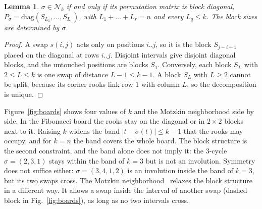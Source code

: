 \documentclass[letterpaper]{article} %
\newtheorem{lemma}{Lemma}
\theoremstyle{definition}
\newcommand{\N}{\mathcal{N}}
\begin{document}
\begin{lemma}\label{lem:blocks}
$\sigma\in\N_k$ if and only if its permutation matrix is block diagonal,
$P_\sigma=\mathrm{diag}(S_{L_1},\dots,S_{L_r})$, with
$L_1+\dots+L_r=n$ and every $L_q\leq k$. The block sizes are determined
by $\sigma$.
\end{lemma}
\begin{proof}
A swap $s(i,j)$ acts only on positions $i..j$, so it is the block
$S_{j-i+1}$ placed on the diagonal at rows $i..j$. Disjoint intervals
give disjoint diagonal blocks, and the untouched positions are blocks
$S_1$. Conversely, each block $S_L$ with $2\leq L\leq k$ is one swap of
distance $L-1\leq k-1$. A block $S_L$ with $L\geq 2$ cannot be split,
because its corner rooks link row $1$ with column $L$, so the
decomposition is unique.
\end{proof}

Figure~\ref{fig:boards} shows four values of $k$ and the Motzkin neighborhood side by side. In the
Fibonacci board the rooks stay on the diagonal or in $2\times 2$ blocks
next to it. Raising $k$ widens the band $|t-\sigma(t)|\leq k-1$ that the
rooks may occupy, and for $k=n$ the band covers the whole board. The
block structure is the second constraint, and the band alone does not
imply it: the $3$-cycle $\sigma=(2,3,1)$ stays within the band of $k=3$
but is not an involution. Symmetry does not suffice either:
$\sigma=(3,4,1,2)$ is an involution inside the band of $k=3$, but its two
swaps cross. The Motzkin neighborhood~\cite{wojewodzki2026soco}
relaxes the block structure in a different way. It allows a swap inside
the interval of another swap (dashed block in Fig.~\ref{fig:boards}), as
long as no two intervals cross.
\end{document}
